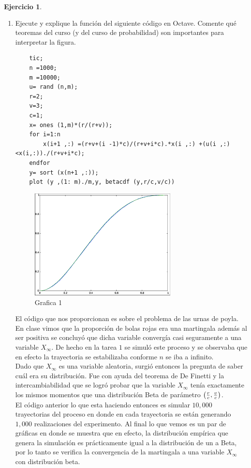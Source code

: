 \documentclass[a5paper,oneside]{amsart}
\theoremstyle{plain}
\theoremstyle{definition}
\newtheorem{ejercicio}{Ejercicio}
\begin{document}
\begin{ejercicio}
\mbox{}
\begin{enumerate}
\item Ejecute y explique la funci\'on del siguiente c\'odigo en Octave. Comente qu\'e teoremas del curso (y del curso de probabilidad) son importantes para interpretar la figura.
\begin{lstlisting}
	tic;
	n =1000;
	m =10000;
	u= rand (n,m);
	r=2;
	v=3;
	c=1;
	x= ones (1,m)*(r/(r+v));
	for i=1:n
		x(i+1 ,:) =(r+v+(i -1)*c)/(r+v+i*c).*x(i ,:) +(u(i ,:) <x(i,:))./(r+v+i*c);
	endfor
	y= sort (x(n+1 ,:));
	plot (y ,(1: m)./m,y, betacdf (y,r/c,v/c))

\end{lstlisting}
\begin{figure}
  \centering
    \includegraphics[width=0.7\textwidth]{PoylaBeta.eps}
  \caption{Grafica 1}
  \label{fig:ejemplo}
\end{figure}
El c\'odigo  que nos proporcionan es sobre el problema de las urnas de poyla. En clase vimos que la proporci\'on de bolas rojas  era una martingala adem\'as al ser positiva se concluy\'o que dicha variable converg\'ia casi seguramente  a una variable $X_\infty$. De hecho en la tarea $1$ se simul\'o este proceso y se observaba que en efecto la trayectoria se estabilizaba conforme $n$ se iba a infinito. \\
Dado que $X_\infty$ es una variable aleatoria, surgi\'o entonces la pregunta de saber cu\'al era su distribuci\'on. Fue con ayuda del teorema de  De Finetti y la intercambiabilidad que se logr\'o probar que la variable $X_\infty$ ten\'ia exactamente los mismos momentos que una distribuci\'on Beta  de par\'ametro $\left( \frac{r}{c},\frac{v}{c}\right) $.\\
El c\'odigo anterior lo que esta haciendo entonces es simular $10,000$ trayectorias del proceso en donde en cada trayectoria se est\'an generando $1,000$  realizaciones del experimento. Al final lo que vemos es un par de gr\'aficas en donde se muestra que en efecto, la distribuci\'on emp\'irica que genera la simulaci\'on es pr\'acticamente igual a la distribuci\'on de un a Beta, por lo tanto se verifica la convergencia de la martingala a una variable $X_\infty$ con distribuci\'on beta.



\end{enumerate}
\end{ejercicio}
\end{document}
